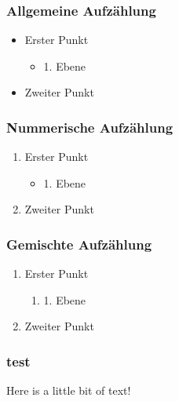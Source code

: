 \subsubsection{Allgemeine Aufzählung}
\label{sec:Allgemeine Aufzählung}
\begin{itemize}
\item Erster Punkt
	\begin{itemize}
		\item 1. Ebene
	\end{itemize}
\item Zweiter Punkt
\end{itemize}

\subsubsection{Nummerische Aufzählung}
\label{sec:Nummerische Aufzählung}
\begin{enumerate} 
\item Erster Punkt
	\begin{itemize}
		\item 1. Ebene
	\end{itemize}
\item Zweiter Punkt
\end{enumerate}

\subsubsection{Gemischte Aufzählung}
\label{sec:Gemischte Aufzählung}
\begin{enumerate} 
	\item Erster Punkt
	\begin{enumerate}
		\item 1. Ebene
	\end{enumerate}
	\item Zweiter Punkt
\end{enumerate}

\subsubsection{test}
\label{sec:test}
Here is a little bit of text! \cite{SecLists/XSSPayloadbox}
